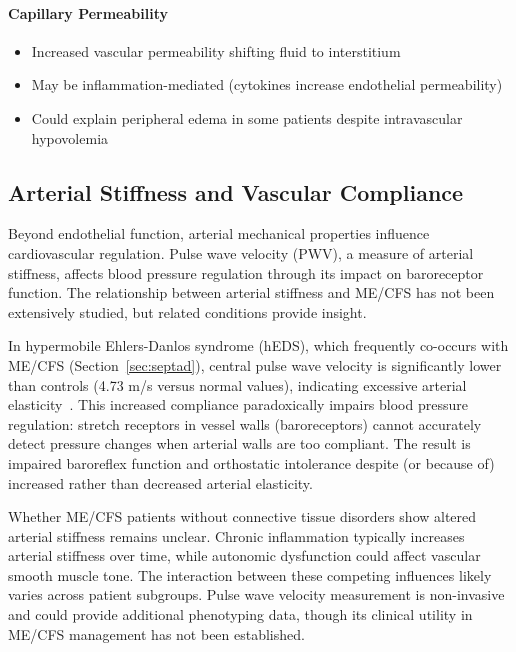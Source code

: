 \paragraph{Capillary Permeability}
\begin{itemize}
    \item Increased vascular permeability shifting fluid to interstitium
    \item May be inflammation-mediated (cytokines increase endothelial permeability)
    \item Could explain peripheral edema in some patients despite intravascular hypovolemia
\end{itemize}

\subsection{Arterial Stiffness and Vascular Compliance}
\label{sec:arterial-stiffness}

Beyond endothelial function, arterial mechanical properties influence cardiovascular regulation. Pulse wave velocity (PWV), a measure of arterial stiffness, affects blood pressure regulation through its impact on baroreceptor function. The relationship between arterial stiffness and ME/CFS has not been extensively studied, but related conditions provide insight.

In hypermobile Ehlers-Danlos syndrome (hEDS), which frequently co-occurs with ME/CFS (Section~\ref{sec:septad}), central pulse wave velocity is significantly lower than controls (4.73 m/s versus normal values), indicating excessive arterial elasticity~\cite{Miller2020arterial}. This increased compliance paradoxically impairs blood pressure regulation: stretch receptors in vessel walls (baroreceptors) cannot accurately detect pressure changes when arterial walls are too compliant. The result is impaired baroreflex function and orthostatic intolerance despite (or because of) increased rather than decreased arterial elasticity.

Whether ME/CFS patients without connective tissue disorders show altered arterial stiffness remains unclear. Chronic inflammation typically increases arterial stiffness over time, while autonomic dysfunction could affect vascular smooth muscle tone. The interaction between these competing influences likely varies across patient subgroups. Pulse wave velocity measurement is non-invasive and could provide additional phenotyping data, though its clinical utility in ME/CFS management has not been established.

